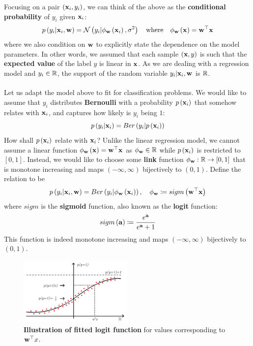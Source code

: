 Focusing on a pair $\left(\mathbf{x}_i,y_i\right)$, we can think of the above as the \textbf{conditional probability} of $y_i$ given $\mathbf{x}_i$: $$ p\left(y_i|\mathbf{x}_i,\mathbf{w}\right) =\mathcal{N}\left(y_i|\phi_{\mathbf{w}}\left(\mathbf{x}_i\right),\sigma^2\right)\quad \text{where}\quad \phi_{\mathbf{w}}\left(\mathbf{x}\right)=\mathbf{w}^\top\mathbf{x}$$
where we also condition on $\mathbf{w}$ to explicitly state the dependence on the model parameters. In other words, we assumed that each sample $\left(\mathbf{x},y\right)$ is such that the \textbf{expected value} of the label $y$ is linear in $\mathbf{x}$. As we are dealing with a regression model and $y_i\in\mathbb{R}$, the support of the random variable $y_i|\mathbf{x}_i,\mathbf{w}$ is $\mathbb{R}$. 
\\~\\
Let us adapt the model above to fit for classification problems. We would like to assume that $y_i$ distributes \textbf{Bernoulli} with a probability $p\left(\mathbf{x}_i\right)$ that somehow relates with $\mathbf{x}_i$, and captures how likely is $y_i$ being $1$: $$ p\left(y_i|\mathbf{x}_i\right)=Ber\left(y_i|p\left(\mathbf{x}_i\right)\right) $$
How shall $p\left(\mathbf{x}_i\right)$ relate with $\mathbf{x}_i$? Unlike the linear regression model, we cannot assume a linear function $\phi_{\mathbf{w}}\left(\mathbf{x}\right)=\mathbf{w}^\top\mathbf{x}$ as $\phi_{\mathbf{w}}\in\mathbb{R}$ while $p\left(\mathbf{x}_i\right)$ is restricted to $\left[0,1\right]$. Instead, we would like to choose some \textbf{link} function $\phi_{\mathbf{w}}:\mathbb{R}\rightarrow\left[0,1\right]$ that is monotone increasing and maps $\left(-\infty,\infty\right)$ bijectively to $\left(0,1\right)$. Define the relation to be
\begin{equation}
	p\left(y_i|\mathbf{x}_i,\mathbf{w}\right) = Ber\left(y_i|\phi_{\mathbf{w}}\left(\mathbf{x}_i\right)\right), \quad \phi_{\mathbf{w}}\coloneqq sigm\left(\mathbf{w}^\top\mathbf{x}\right)
	\label{eqn:logistic_model}
\end{equation}
where $sigm$ is the \textbf{sigmoid} function, also known as the \textbf{logit} function: $$ sigm\left(\mathbf{a}\right)\coloneqq\frac{e^{\mathbf{a}}}{e^{\mathbf{a}} + 1} $$
This function is indeed monotone increasing and maps $\left(-\infty,\infty\right)$ bijectively to $\left(0,1\right)$.

\begin{figure}[h!]
	\centering
	\includegraphics[width=0.5\textwidth]{chapters/classification/figures/3_7.png}
	\caption{\textbf{Illustration of fitted logit function} for values corresponding to $\mathbf{w}^\top x$.}
\end{figure}


